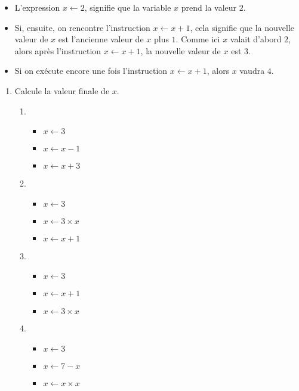 \documentclass[class=report,crop=false, 12pt]{standalone}
\begin{document}
\begin{activite}
\sauteligne
\begin{itemize}
  \item L'expression $x \leftarrow 2$, signifie que la variable $x$ prend la valeur $2$.
  \item Si, ensuite, on rencontre l'instruction $x \leftarrow x + 1$, cela signifie que la nouvelle valeur de $x$ est l'ancienne valeur de $x$ plus $1$. Comme ici $x$ valait d'abord $2$, alors après l'instruction $x \leftarrow x + 1$, la nouvelle valeur de $x$ est $3$.
  \item Si on exécute encore une fois l'instruction $x \leftarrow x + 1$, alors $x$ vaudra $4$.
\end{itemize}

\begin{enumerate}
  \item Calcule la valeur finale de $x$.
  \begin{enumerate}
    
    \item 
    \begin{itemize}
      \item $x \leftarrow 3$
      \item $x \leftarrow x - 1$
      \item $x \leftarrow x + 3$
    \end{itemize}
    
    \item
    \begin{itemize}
      \item $x \leftarrow 3$
      \item $x \leftarrow 3 \times x$ 
      \item $x \leftarrow x + 1$
    \end{itemize}
    
    \item 
    \begin{itemize}
      \item $x \leftarrow 3$
      \item $x \leftarrow x + 1$
      \item $x \leftarrow 3 \times x$
    \end{itemize}
    
    \item 
    \begin{itemize}
      \item $x \leftarrow 3$
      \item $x \leftarrow 7 - x$
      \item $x \leftarrow x \times x$
    \end{itemize}     
  \end{enumerate}    
  

\end{enumerate}
\end{activite}
\end{document}
